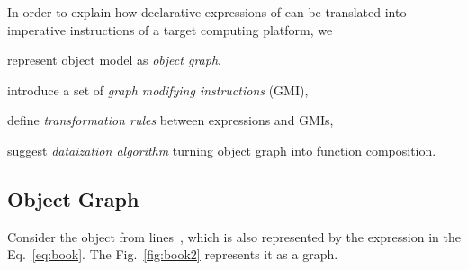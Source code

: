 \renewcommand\therule{R\arabic{rule}}
\newcommand\rr{\smalltriangleright{}}
\newcommand\rrule[1]{{\scshape\sffamily\ref{rule:#1}}}
\newcommand{\jrule}[1]{%
  \refstepcounter{rule}\label{rule:#1}%
  \text{\textbf{\rrule{#1}}}}
\newcommand*{\ohat}[2]{%
  \stackrel{\textcolor{gray}{#1}}{%
    \textcolor{gray}{%
      \overlinesegment{\textcolor{black}{%
        \vrule height 8pt depth 1pt width 0pt%
        #2%
      }}%
    }%
  }%
}
\newenvironment{algo}
  {\newcommand\kw[1]{{\bfseries\sffamily ##1}}
  \newcommand\tab{{\hspace*{1em}}}
  \noindent}
  {}

In order to explain how declarative expressions of \phic{} can
be translated into imperative instructions of a target computing platform, we
\begin{inparaenum}[1)]
\item represent object model as \emph{object graph},
\item introduce a set of \emph{graph modifying instructions} (GMI),
\item define \emph{transformation rules} between \phic{} expressions and GMIs,
\item suggest \emph{dataization algorithm} turning object graph into function composition.
\end{inparaenum}

\subsection{Object Graph}

Consider the object from lines~,
which is also represented by the expression in the Eq.~\ref{eq:book}.
The Fig.~\ref{fig:book2} represents it as a graph.

